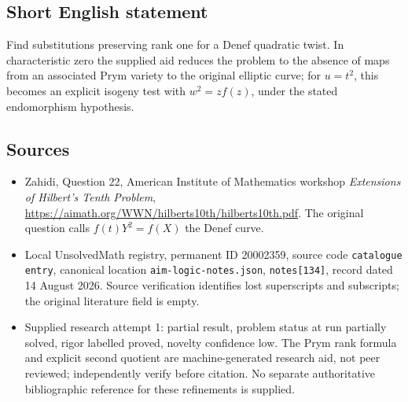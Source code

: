 \documentclass[11pt]{article}
\begin{document}
\subsection{Short English statement}
Find substitutions preserving rank one for a Denef quadratic twist. In characteristic zero the supplied aid reduces the problem to the absence of maps from an associated Prym variety to the original elliptic curve; for $u=t^2$, this becomes an explicit isogeny test with $w^2=z f(z)$, under the stated endomorphism hypothesis.
\subsection{Sources}
\begin{itemize}
\item Zahidi, Question 22, American Institute of Mathematics workshop \emph{Extensions of Hilbert's Tenth Problem}, \url{https://aimath.org/WWN/hilberts10th/hilberts10th.pdf}. The original question calls $f(t)Y^2=f(X)$ the Denef curve.
\item Local UnsolvedMath registry, permanent ID 20002359, source code \texttt{catalogue entry}, canonical location \texttt{aim-logic-notes.json}, \texttt{notes[134]}, record dated 14 August 2026. Source verification identifies lost superscripts and subscripts; the original literature field is empty.
\item Supplied research attempt 1: partial result, problem status at run partially solved, rigor labelled proved, novelty confidence low. The Prym rank formula and explicit second quotient are machine-generated research aid, not peer reviewed; independently verify before citation. No separate authoritative bibliographic reference for these refinements is supplied.
\end{itemize}
\end{document}
